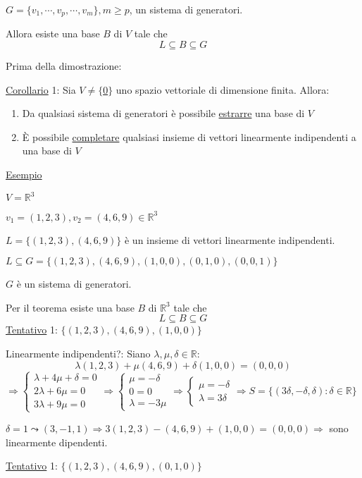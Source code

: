 \documentclass{article}
\newcommand{\ul}[1]{\underline{#1}}
\newcommand{\R}{\mathbb{R}}
\begin{document}
$G=\{v_1,\cdots,v_p,\cdots,v_m\},m\ge p$, un sistema di generatori.

	Allora esiste una base $B$ di $V$ tale che
	$$L\subseteq B\subseteq G$$

	Prima della dimostrazione:

	\ul{Corollario} 1: Sia $V\not=\{$\ul{0}$\}$ uno spazio vettoriale di dimensione finita. Allora:
	\begin{enumerate}
		\item Da qualsiasi sistema di generatori è possibile \ul{estrarre} una base di $V$
		\item È possibile \ul{completare} qualsiasi insieme di vettori linearmente indipendenti a una base di $V$
	\end{enumerate}

	\ul{Esempio}

$V=\R^3$

$v_1=(1,2,3),v_2=(4,6,9)\in\R^3$

$L=\{(1,2,3),(4,6,9)\}$ è un insieme di vettori linearmente indipendenti.

$L\subseteq G=\{(1,2,3),(4,6,9),(1,0,0),(0,1,0),(0,0,1)\}$

$G$ è un sistema di generatori.

	Per il teorema esiste una base $B$ di $\R^3$ tale che
	$$L\subseteq B\subseteq G$$
	\ul{Tentativo} 1: $\{(1,2,3),(4,6,9),(1,0,0)\}$

	Linearmente indipendenti?: Siano $\lambda,\mu,\delta\in\R:$
	$$\lambda(1,2,3)+\mu(4,6,9)+\delta(1,0,0)=(0,0,0)$$
$\Rightarrow\begin{cases}
	\lambda+4\mu+\delta=0 \\
	2\lambda+6\mu=0       \\
	3\lambda+9\mu=0
\end{cases}\Rightarrow
\begin{cases}
	\mu=-\delta \\
	0=0         \\
	\lambda=-3\mu
\end{cases}\Rightarrow
\begin{cases}
	\mu=-\delta \\
	\lambda=3\delta
\end{cases}\Rightarrow
S=\{(3\delta,-\delta,\delta):\delta\in\R\}$

$\delta=1\leadsto(3,-1,1)\Rightarrow3(1,2,3)-(4,6,9)+(1,0,0)=(0,0,0)\Rightarrow$ sono linearmente dipendenti.

	\ul{Tentativo} 1: $\{(1,2,3),(4,6,9),(0,1,0)\}$
\end{document}
